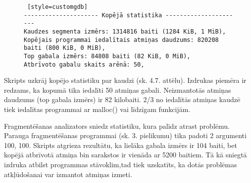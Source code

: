 \begin{figure}[h]
\begin{lstlisting} [style=customgdb]
--------------------- Kopējā statistika ----------------------
Kaudzes segmenta izmērs: 1314816 baiti (1284 KiB, 1 MiB),
Kopējais programmai iedalītais atmiņas daudzums: 820208 baiti (800 KiB, 0 MiB),
Top gabala izmērs: 84808 baiti (82 KiB, 0 MiB),
Atbrīvoto gabalu skaits arēnā: 50,
\end{lstlisting}
\caption{\textbf{\fontsize{11}{12}\selectfont {Kopējā statistika}}}
\end{figure}

Skripts uzkrāj kopējo statistiku par kaudzi (sk. 4.7. attēlu). Izdrukas piemēra  ir redzams, ka kopumā tika iedalīti 50 atmiņas gabali.
Neizmantotās atmiņas daudzums (top gabala izmērs) ir 82 kilobaiti.
2/3 no iedalītās atmiņas kaudzē tiek iedalītas programmai ar malloc() vai līdzīgam funkcijām.

Fragmentēšanas analizators sniedz statistiku, kura palīdz atrast problēmu.
Parauga fragmentēšanas programmai (sk. 3. pielikumu) tika padoti 2 argumenti 100, 100. Skripts atgrieza rezultātu, ka lielāka gabala izmērs ir 104 baiti, bet kopējā atbrīvotā atmiņa bin sarakstos ir vienāda ar 5200 baitiem.
Tā kā sniegtā izdruka atbilst programmas stāvoklim,tad tiek uzskatīts, ka dotās problēmas atkļūdošanai var izmantot atmiņas izmeti.





